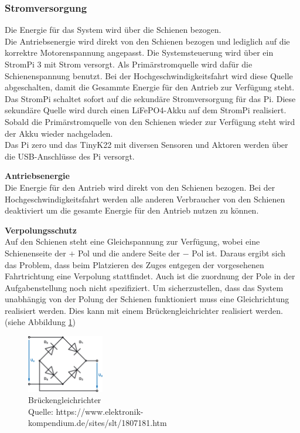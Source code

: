 \documentclass[../../main.tex]{subfiles}
\begin{document}
    \subsubsection{Stromversorgung} \label{et_stromversorgung}
    Die Energie für das System wird über die Schienen bezogen.\\ 
    Die Antriebsenergie wird direkt von den Schienen bezogen und lediglich auf die korrektre Motorenspannung angepasst. Die Systemsteuerung wird über ein StromPi 3 mit Strom versorgt. Als Primärstromquelle wird dafür die Schienenspannung benutzt. Bei der Hochgeschwindigkeitsfahrt wird diese Quelle abgeschalten, damit die Gesammte Energie für den Antrieb zur Verfügung steht. Das StromPi schaltet sofort auf die sekundäre Stromversorgung für das Pi. Diese sekundäre Quelle wird durch einen LiFePO4-Akku auf dem StromPi realisiert. Sobald die Primärstromquelle von den Schienen wieder zur Verfügung steht wird der Akku wieder nachgeladen.\\
    Das Pi zero und das TinyK22 mit diversen Sensoren und Aktoren werden über die USB-Anschlüsse des Pi versorgt.

    \textbf{Antriebsenergie}\\
    Die Energie für den Antrieb wird direkt von den Schienen bezogen. Bei der Hochgeschwindigkeitsfahrt werden alle anderen Verbraucher von den Schienen deaktiviert um die gesamte Energie für den Antrieb nutzen zu können.
    
    \textbf{Verpolungsschutz}\\
    Auf den Schienen steht eine Gleichspannung zur Verfügung, wobei eine Schienenseite der $+$ Pol und die andere Seite der $-$ Pol ist. Daraus ergibt sich das Problem, dass beim Platzieren des Zuges entgegen der vorgesehenen Fahrtrichtung eine Verpolung stattfindet. Auch ist die zuordnung der Pole in der Aufgabenstellung noch nicht spezifiziert. Um sicherzustellen, dass das System unabhängig von der Polung der Schienen funktioniert muss eine Gleichrichtung realisiert werden. Dies kann mit einem Brückengleichrichter realisiert werden. (siehe Abbildung \ref{fig:et_bruckengleichrichter})

    \begin{figure}[H]
        \centering
        \includegraphics[width=0.3\textwidth]{Brueckengleichrichter.png}
        \caption {Brückengleichrichter \\Quelle: https://www.elektronik-kompendium.de/sites/slt/1807181.htm}
        \label{fig:et_bruckengleichrichter}
    \end{figure}
\end{document}
